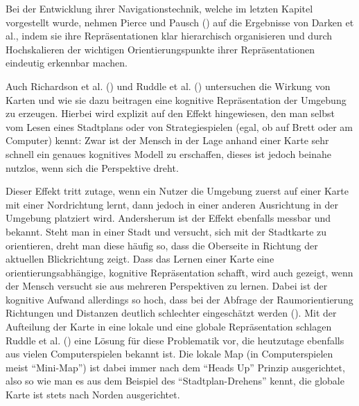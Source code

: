 Bei der Entwicklung ihrer Navigationstechnik, welche im letzten Kapitel vorgestellt wurde, nehmen Pierce und Pausch (\cite{pierce_representations}) auf die Ergebnisse von Darken et al., indem sie ihre Repräsentationen klar hierarchisch organisieren und durch Hochskalieren der wichtigen Orientierungspunkte ihrer Repräsentationen eindeutig erkennbar machen.

Auch Richardson et al. (\cite{Richardson1999}) und Ruddle et al. (\cite{Ruddle1999TheEnvironments}) untersuchen die Wirkung von Karten und wie sie dazu beitragen eine kognitive Repräsentation der Umgebung zu erzeugen.
Hierbei wird explizit auf den Effekt hingewiesen, den man selbst vom Lesen eines Stadtplans oder von Strategiespielen (egal, ob auf Brett oder am Computer) kennt: Zwar ist der Mensch in der Lage anhand einer Karte sehr schnell ein genaues kognitives Modell zu erschaffen, dieses ist jedoch beinahe nutzlos, wenn sich die Perspektive dreht.

Dieser Effekt tritt zutage, wenn ein Nutzer die Umgebung zuerst auf einer Karte mit einer Nordrichtung lernt, dann jedoch in einer anderen Ausrichtung in der Umgebung platziert wird. Andersherum ist der Effekt ebenfalls messbar und bekannt. Steht man in einer Stadt und versucht, sich mit der Stadtkarte zu orientieren, dreht man diese häufig so, dass die Oberseite in Richtung der aktuellen Blickrichtung zeigt. Dass das Lernen einer Karte eine orientierungsabhängige, kognitive Repräsentation schafft, wird auch gezeigt, wenn der Mensch versucht sie aus mehreren Perspektiven zu lernen. Dabei ist der kognitive Aufwand allerdings so hoch, dass bei der Abfrage der Raumorientierung Richtungen und Distanzen deutlich schlechter eingeschätzt werden (\cite{Richardson1999}).
Mit der Aufteilung der Karte in eine lokale und eine globale Repräsentation schlagen Ruddle et al. (\cite{Ruddle1999TheEnvironments}) eine Lösung für diese Problematik vor, die heutzutage ebenfalls aus vielen Computerspielen bekannt ist. Die lokale Map (in Computerspielen meist “Mini-Map”) ist dabei immer nach dem “Heads Up” Prinzip ausgerichtet, also so wie man es aus dem Beispiel des “Stadtplan-Drehens” kennt, die globale Karte ist stets nach Norden ausgerichtet.

